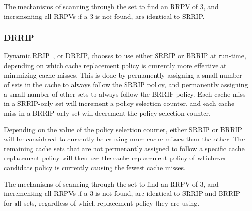 The mechanisms of scanning through the set to find an RRPV of 3, and incrementing all RRPVs if a 3 is not found, are identical to SRRIP.

\subsubsection{DRRIP}

Dynamic RRIP~\cite{jaleeltheobald10}, or DRRIP, chooses to use either SRRIP or BRRIP at run-time, depending on which cache replacement policy is currently more effective at minimizing cache misses.  This is done by permanently assigning a small number of sets in the cache to always follow the SRRIP policy, and permanently assigning a small number of other sets to always follow the BRRIP policy.  Each cache miss in a SRRIP-only set will increment a policy selection counter, and each cache miss in a BRRIP-only set will decrement the policy selection counter.

Depending on the value of the policy selection counter, either SRRIP or BRRIP will be considered to currently be causing more cache misses than the other.  The remaining cache sets that are not permenantly assigned to follow a specific cache replacement policy will then use the cache replacement policy of whichever candidate policy is currently causing the fewest cache misses.

The mechanisms of scanning through the set to find an RRPV of 3, and incrementing all RRPVs if a 3 is not found, are identical to SRRIP and BRRIP for all sets, regardless of which replacement policy they are using.

